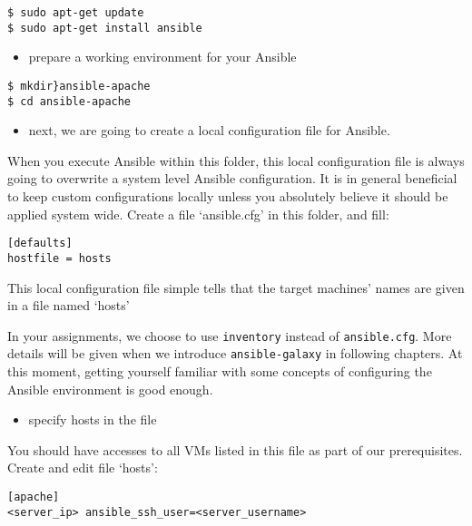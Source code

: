 \begin{lstlisting}
$ sudo apt-get update
$ sudo apt-get install ansible
\end{lstlisting}

\begin{itemize}

\item
  prepare a working environment for your Ansible
\end{itemize}

\begin{lstlisting}
$ mkdir}ansible-apache
$ cd ansible-apache
\end{lstlisting}

\begin{itemize}

\item
  next, we are going to create a local configuration file for Ansible.
\end{itemize}

When you execute Ansible within this folder, this local configuration
file is always going to overwrite a system level Ansible configuration.
It is in general beneficial to keep custom configurations locally unless
you absolutely believe it should be applied system wide. Create a file
`ansible.cfg' in this folder, and fill:

\begin{verbatim}
[defaults]
hostfile = hosts
\end{verbatim}

This local configuration file simple tells that the target machines'
names are given in a file named `hosts'

In your assignments, we choose to use \texttt{inventory} instead of
\texttt{ansible.cfg}. More details will be given when we introduce
\texttt{ansible-galaxy} in following chapters. At this moment, getting
yourself familiar with some concepts of configuring the Ansible
environment is good enough.

\begin{itemize}

\item
  specify hosts in the file
\end{itemize}

You should have accesses to all VMs listed in this file as part of our
prerequisites. Create and edit file `hosts':

\begin{verbatim}
[apache]
<server_ip> ansible_ssh_user=<server_username>
\end{verbatim}

